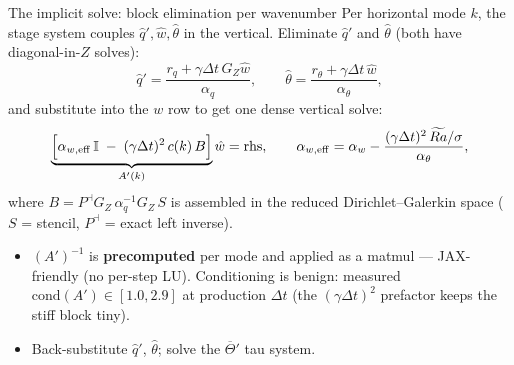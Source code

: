\documentclass[aspectratio=169,10pt]{beamer}
\newcommand{\Rat}{\widetilde{Ra}}
\newcommand{\Tb}{\overline{\Theta}}
\begin{document}
\begin{frame}{The implicit solve: block elimination per wavenumber}
  Per horizontal mode $k$, the stage system couples $\hat q',\hat w,\hat\theta$ in the
  vertical. Eliminate $\hat q'$ and $\hat\theta$ (both have diagonal-in-$Z$ solves):
  \[
    \hat q' = \frac{r_q + \gamma\Delta t\, G_Z\hat w}{\alpha_q},
    \qquad
    \hat\theta = \frac{r_\theta + \gamma\Delta t\, \hat w}{\alpha_\theta},
  \]
  and substitute into the $w$ row to get one dense vertical solve:
  \[
    \underbrace{\Bigl[\alpha_{w,\mathrm{eff}}\, \mathbb{I}
      \;-\; (\gamma\Delta t)^2\, c(k)\, B\Bigr]}_{A'(k)} \hat w = \mathrm{rhs},
    \qquad
    \alpha_{w,\mathrm{eff}} = \alpha_w - \frac{(\gamma\Delta t)^2\,\Rat/\sigma}{\alpha_\theta},
  \]
  where $B = P^{\dashv} G_Z\, \alpha_q^{-1} G_Z\, S$ is assembled in the reduced
  Dirichlet--Galerkin space ($S$ = stencil, $P^{\dashv}$ = exact left inverse).
  \begin{itemize}
    \item $(A')^{-1}$ is \textbf{precomputed} per mode and applied as a matmul ---
      JAX-friendly (no per-step LU). Conditioning is benign:
      measured $\mathrm{cond}(A') \in [1.0, 2.9]$ at production $\Delta t$
      (the $(\gamma\Delta t)^2$ prefactor keeps the stiff block tiny).
    \item Back-substitute $\hat q'$, $\hat\theta$; solve the $\Tb'$ tau system.
  \end{itemize}
\end{frame}
\end{document}

